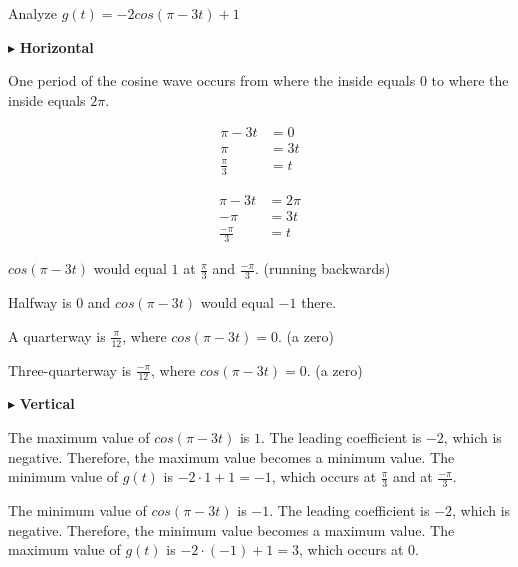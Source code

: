 \documentclass{ximera}
\begin{document}
\begin{example}



Analyze  $g(t) = -2 cos(\pi - 3t) + 1$


\begin{explanation}

$\blacktriangleright$ \textbf{Horizontal}


One period of the cosine wave occurs from where the inside equals $0$ to where the inside equals $2 \pi$.


\begin{align*}
\pi - 3t  & =  0 \\
\pi       & =  3t \\
\frac{\pi}{3}       & =  t
\end{align*}



\begin{align*}
\pi - 3t  & =  2 \pi \\
-\pi      & =  3t \\
\frac{-\pi}{3}       & =  t
\end{align*}


$cos(\pi - 3t)$ would equal $1$ at $\frac{\pi}{3}$ and $\frac{-\pi}{3}$. (running backwards)

Halfway is $0$ and $cos(\pi - 3t)$ would equal $-1$ there.

A quarterway is $\frac{\pi}{12}$, where $cos(\pi - 3t) = 0$.  (a zero)

Three-quarterway is $\frac{-\pi}{12}$, where $cos(\pi - 3t) = 0$. (a zero)






$\blacktriangleright$ \textbf{Vertical}


The maximum value of $cos(\pi - 3t)$ is $1$.  The leading coefficient is $-2$, which is negative.  Therefore, the maximum value becomes a minimum value. The minimum value of $g(t)$ is $-2 \cdot 1 + 1 = -1$, which occurs at $\frac{\pi}{3}$ and at $\frac{-\pi}{3}$. 




The minimum value of $cos(\pi - 3t)$ is $-1$.  The leading coefficient is $-2$, which is negative.   Therefore, the minimum value becomes a maximum value.  The maximum value of $g(t)$ is $-2 \cdot (-1) + 1 = 3$, which occurs at $0$. 











\end{explanation}
\end{example}
\end{document}
